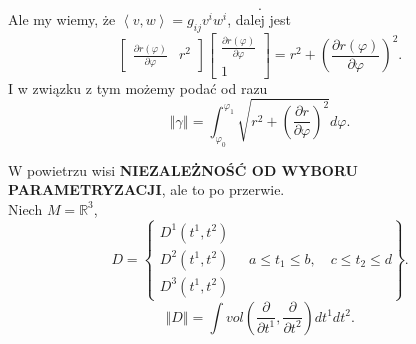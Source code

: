 \documentclass[../main.tex]{subfiles}
\begin{document}
\begin{przyklad}
\[.\]
Ale my wiemy, że $\left<v, w \right> = g_{ij} v^iw^i$, dalej jest
\[
    \begin{bmatrix} \frac{\partial r(\varphi)}{\partial \varphi}& r^2 \end{bmatrix} \begin{bmatrix} \frac{\partial r(\varphi)}{\partial \varphi} \\ 1 \end{bmatrix} = r^2 + \left( \frac{\partial r(\varphi)}{\partial \varphi}  \right) ^2
.\]
I w związku z tym możemy podać od razu
\[
    \left\Vert \gamma \right\Vert = \int_{\varphi_0}^{\varphi_1}\sqrt{r^2 + \left( \frac{\partial r}{\partial \varphi}  \right) ^2} d\varphi
.\]
\end{przyklad}
W powietrzu wisi \textbf{NIEZALEŻNOŚĆ OD WYBORU PARAMETRYZACJI}, ale to po przerwie.\\
Niech $M = \mathbb{R}^3$,
\[
    D = \left\{ \begin{matrix}D^1(t^1, t^2)\\ D^2(t^1, t^2)\\ D^3(t^1, t^2)\end{matrix}\quad a\le t_1 \le b,\quad c \le t_2 \le d\right\}
.\]
\[
    \left\Vert D \right\Vert = \int vol\left( \frac{\partial }{\partial t^1} , \frac{\partial }{\partial t^2}  \right) dt^1dt^2
.\]
\end{document}
